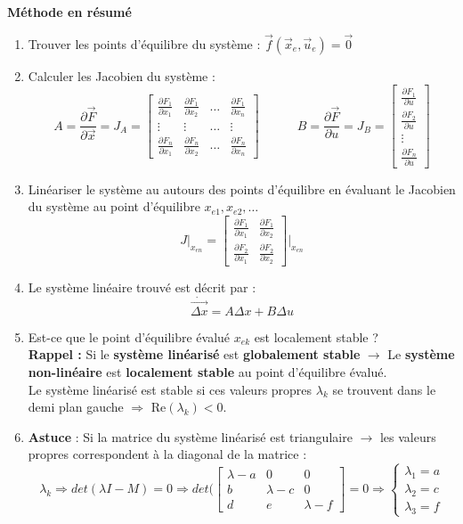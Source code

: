 \documentclass[document.tex]{subfiles}
\begin{document}
\textbf{Méthode en résumé}
\begin{enumerate}
\item Trouver les points d'équilibre du système : $\boxed{\vec{f}(\vec{x}_e,\vec{u}_e)= \vec{0}}$ 
\item Calculer les Jacobien du système : 
$$
\boxed{A = \dfrac{\partial \vec{F}}{\partial \vec{x}} = J_{A} = \begin{bmatrix} \frac{\partial F_1}{\partial x_1} & \frac{\partial F_1}{\partial x_2} & \ldots & \frac{\partial F_1}{\partial x_n}\\ \vdots & \vdots & \ldots & \vdots \\ \frac{\partial F_n}{\partial x_1} & \frac{\partial F_n}{\partial x_2} & \ldots & \frac{\partial F_n}{\partial x_n} \end{bmatrix}} \quad \quad \quad \boxed{B = \dfrac{\partial \vec{F}}{\partial u} = J_{B}= \begin{bmatrix} \frac{\partial F_1}{\partial u} \\  \frac{\partial F_2}{\partial u} \\ \vdots \\ \frac{\partial F_n}{\partial u} \end{bmatrix}} $$
\item Linéariser le système au autours des points d'équilibre en évaluant le Jacobien du système au point d'équilibre $x_{e1},x_{e2},\ldots$ 
$$
\boxed{ J\big\vert_{x_{en}}= \begin{bmatrix} \frac{\partial F_1}{\partial x_1} & \frac{\partial F_1}{\partial x_2} \\ \frac{\partial F_2}{\partial x_1} & \frac{\partial F_2}{\partial x_2}  \end{bmatrix} \Bigg\vert_{x_{en}}}
$$
\item Le système linéaire trouvé est décrit par :
$$
\boxed{\dot{\overrightarrow{\Delta x}} = A \Delta x + B \Delta u}
$$
\item Est-ce que le point d'équilibre évalué $x_{ek}$ est localement stable ?\\
\textbf{Rappel : } Si le \textbf{système linéarisé} est \textbf{globalement stable} $\rightarrow$ Le \textbf{système non-linéaire} est \textbf{localement stable} au point d'équilibre évalué.\\
Le système linéarisé est stable si ces valeurs propres $\lambda_k$ se trouvent dans le demi plan gauche $\Rightarrow$ $\boxed{\text{Re}(\lambda_k)<0}$.
\item \textbf{Astuce} : Si la matrice du système linéarisé est triangulaire $\longrightarrow$ les valeurs propres correspondent à la diagonal de la matrice :
$$
\lambda_k \Rightarrow det(\lambda I-M) = 0 \Rightarrow det(\begin{bmatrix} \lambda - a & 0 & 0 \\ b & \lambda - c & 0 \\ d & e & \lambda - f \end{bmatrix} = 0 \Rightarrow \begin{cases} \lambda_1 = a \\ \lambda_2 = c \\ \lambda_3 = f \end{cases}
$$
\end{enumerate}
\end{document}
